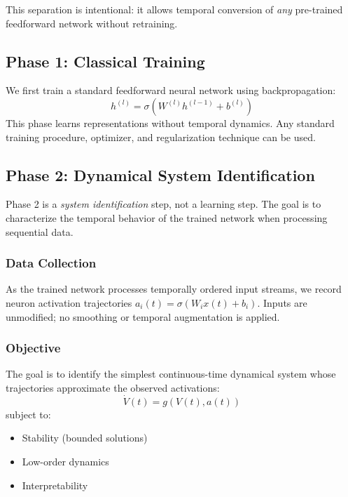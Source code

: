 \documentclass[11pt]{article}
\begin{document}
This separation is intentional: it allows temporal conversion of \emph{any} pre-trained feedforward network without retraining.

\subsection{Phase 1: Classical Training}

We first train a standard feedforward neural network using backpropagation:
\begin{equation}
h^{(l)} = \sigma(W^{(l)} h^{(l-1)} + b^{(l)})
\end{equation}
This phase learns representations without temporal dynamics. Any standard training procedure, optimizer, and regularization technique can be used.

\subsection{Phase 2: Dynamical System Identification}

Phase 2 is a \emph{system identification} step, not a learning step. The goal is to characterize the temporal behavior of the trained network when processing sequential data.

\subsubsection{Data Collection}

As the trained network processes temporally ordered input streams, we record neuron activation trajectories $a_i(t) = \sigma(W_i x(t) + b_i)$. Inputs are unmodified; no smoothing or temporal augmentation is applied.

\subsubsection{Objective}

The goal is to identify the simplest continuous-time dynamical system whose trajectories approximate the observed activations:
\begin{equation}
\dot{V}(t) = g(V(t), a(t))
\end{equation}
subject to:
\begin{itemize}
    \item Stability (bounded solutions)
    \item Low-order dynamics
    \item Interpretability
\end{itemize}
\end{document}
